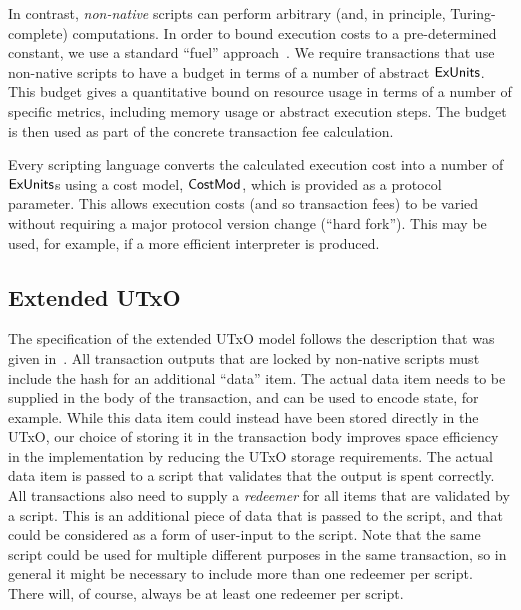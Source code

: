 In contrast, \emph{non-native} scripts can perform arbitrary
(and, in principle, Turing-complete) computations.
In order to bound execution costs to a pre-determined constant, we use a standard ``fuel'' approach~\cite{XX}.
We require transactions that use non-native scripts
to have a budget in terms of a number of abstract $\mathsf{ExUnits}$.
This budget gives a quantitative bound on resource usage in terms of a number of specific metrics, including memory usage or abstract execution steps.
The budget is then used as part of the concrete transaction fee calculation.

Every scripting language
converts the calculated execution cost into a number of $\mathsf{ExUnits}$s using a cost model,
$\mathsf{CostMod}$, which is provided as a protocol parameter.
This allows execution costs (and so transaction fees) to be varied without requiring a major protocol version change (``hard fork'').
This may be used, for example, if a more efficient interpreter is produced.

\subsection{Extended UTxO}

The specification of the extended UTxO model follows the description that was given in~\cite{plutus_eutxo}.
All transaction outputs that are locked by non-native scripts must include the hash for an additional ``data'' item.  The actual data item needs to be supplied in the body of the transaction,   and can be used to encode state, for example.
While this data item could instead have been stored directly in the UTxO, our choice of storing it in the transaction body improves space efficiency in the implementation by reducing the UTxO storage requirements. The actual data item is passed to a script that validates that the output is spent correctly.
All transactions also need to supply a \emph{redeemer} for all items that are validated by a script.  This is an additional piece of data that is passed to the script, and that could be considered as a form of user-input to the script. Note that the same script could be used for multiple different purposes in the same transaction, so in general it might be necessary to include more than one redeemer per script.
There will, of course, always be at least one redeemer per script.  
